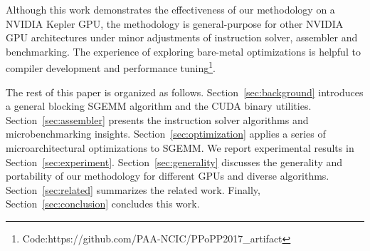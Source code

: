 Although this work demonstrates the effectiveness of our methodology on a NVIDIA Kepler GPU, the methodology is general-purpose for 
other NVIDIA GPU architectures under minor adjustments of instruction solver, assembler and benchmarking.
The experience of 
exploring bare-metal optimizations is helpful to compiler development and performance tuning\footnote{\scriptsize{Code:https://github.com/PAA-NCIC/PPoPP2017\_artifact}}. 

The rest of this paper is organized as follows. Section~\ref{sec:background} introduces 
a general blocking SGEMM algorithm and the CUDA binary utilities.
Section~\ref{sec:assembler} presents the instruction solver algorithms and
microbenchmarking 
insights. Section~\ref{sec:optimization} applies a series of microarchitectural optimizations to SGEMM. We report 
experimental results in Section~\ref{sec:experiment}.
Section~\ref{sec:generality} discusses the generality and portability of our methodology for different GPUs and diverse algorithms.
Section~\ref{sec:related} summarizes the related work. Finally, 
Section~\ref{sec:conclusion} concludes this work. 
